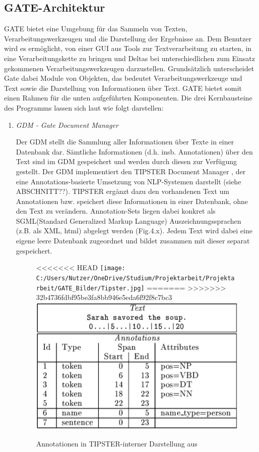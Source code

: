 \documentclass[12pt]{report}
\begin{document}
\subsection{GATE-Architektur}
GATE bietet eine Umgebung für das Sammeln von Texten, Verarbeitungswerkzeugen und die Darstellung der Ergebnisse an. Dem Benutzer wird es ermöglicht, von einer GUI aus Tools zur Textverarbeitung zu starten, in eine Verarbeitungskette zu bringen und Deltas bei unterschiedlichen zum Einsatz gekommenen Verarbeitungswerkzeugen darzustellen. Grundsätzlich unterscheidet Gate dabei Module von Objekten, das bedeutet Verarbeitungswerkzeuge und Text sowie die Darstellung von Informationen über Text. GATE bietet somit einen Rahmen für die unten aufgeführten Komponenten. Die drei Kernbausteine des Programms lassen sich laut \cite{cu02} wie folgt darstellen:
\begin{enumerate}
\item \textit{GDM - Gate Document Manager}

Der GDM stellt die Sammlung aller Informationen über Texte in einer Datenbank dar. Sämtliche Informationen (d.h. insb. Annotationen) über den Text sind im GDM gespeichert und werden durch diesen zur Verfügung gestellt. Der GDM implementiert den TIPSTER Document Manager \cite{cu97}, der eine Annotations-basierte Umsetzung von NLP-Systemen darstellt (siehe ABSCHNITT??). TIPSTER ergänzt dazu den vorhandenen Text um Annotationen bzw. speichert diese Informationen in einer Datenbank, ohne den Text zu verändern. Annotation-Sets liegen dabei konkret als SGML(Standard Generalized Markup Language) Auszeichnungssprachen (z.B. als XML, html) abgelegt werden (Fig.4.x). Jedem Text wird dabei eine eigene leere Datenbank zugeordnet und bildet zusammen mit dieser separat gespeichert.

\begin{figure}[h!]
\begin{center}
<<<<<<< HEAD
\texttt{[image: C:/Users/Nutzer/OneDrive/Studium/Projektarbeit/Projektarbeit/GATE\_Bilder/Tipster.jpg]}
=======
>>>>>>> 32b4736fdbf95be3fa8bb946e5eda6f92f8c7bc3
\includegraphics[scale=0.5]{GATE_Bilder/Tipster.jpg}
\caption{Annotationen in TIPSTER-interner Darstellung aus \cite{cu97}}
\end{center}
\end{figure} 


\end{enumerate}
\end{document}
